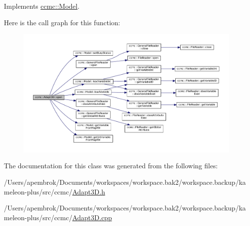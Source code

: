 Implements \hyperlink{classccmc_1_1_model_a3c64dc635c2c1a2fe2f8efa2a3666282}{ccmc\-::\-Model}.



Here is the call graph for this function\-:\nopagebreak
\begin{figure}[H]
\begin{center}
\leavevmode
\includegraphics[width=350pt]{classccmc_1_1_adapt3_d_a02a5f2b5ba26cacd93f7c41c68c4b24a_cgraph}
\end{center}
\end{figure}




The documentation for this class was generated from the following files\-:\begin{DoxyCompactItemize}
\item 
/\-Users/apembrok/\-Documents/workspaces/workspace.\-bak2/workspace.\-backup/kameleon-\/plus/src/ccmc/\hyperlink{_adapt3_d_8h}{Adapt3\-D.\-h}\item 
/\-Users/apembrok/\-Documents/workspaces/workspace.\-bak2/workspace.\-backup/kameleon-\/plus/src/ccmc/\hyperlink{_adapt3_d_8cpp}{Adapt3\-D.\-cpp}\end{DoxyCompactItemize}
